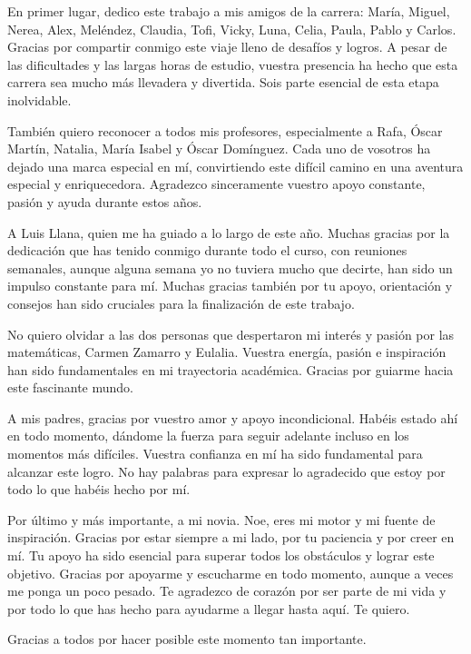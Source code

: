 \documentclass[11pt,a4paper]{book}
\begin{document}
En primer lugar, dedico este trabajo a mis amigos de la carrera: María, Miguel, Nerea, Alex, Meléndez, Claudia, Tofi, Vicky, Luna, Celia, Paula, Pablo y Carlos. Gracias por compartir conmigo este viaje lleno de desafíos y logros. A pesar de las dificultades y las largas horas de estudio, vuestra presencia ha hecho que esta carrera sea mucho más llevadera y divertida. Sois parte esencial de esta etapa inolvidable.

También quiero reconocer a todos mis profesores, especialmente a Rafa, Óscar Martín, Natalia, María Isabel y Óscar Domínguez. Cada uno de vosotros ha dejado una marca especial en mí, convirtiendo este difícil camino en una aventura especial y enriquecedora. Agradezco sinceramente vuestro apoyo constante, pasión y ayuda durante estos años.

A Luis Llana, quien me ha guiado a lo largo de este año. Muchas gracias por la dedicación que has tenido conmigo durante todo el curso, con reuniones semanales, aunque alguna semana yo no tuviera mucho que decirte, han sido un impulso constante para mí. Muchas gracias también por tu apoyo, orientación y consejos han sido cruciales para la finalización de este trabajo.

No quiero olvidar a las dos personas que despertaron mi interés y pasión por las matemáticas, Carmen Zamarro y Eulalia. Vuestra energía, pasión e inspiración han sido fundamentales en mi trayectoria académica. Gracias por guiarme hacia este fascinante mundo.
 

A mis padres, gracias por vuestro amor y apoyo incondicional. Habéis estado ahí en todo momento, dándome la fuerza para seguir adelante incluso en los momentos más difíciles. Vuestra confianza en mí ha sido fundamental para alcanzar este logro. No hay palabras para expresar lo agradecido que estoy por todo lo que habéis hecho por mí.

Por último y más importante, a mi novia. Noe, eres mi motor y mi fuente de inspiración. Gracias por estar siempre a mi lado, por tu paciencia y por creer en mí. Tu apoyo ha sido esencial para superar todos los obstáculos y lograr este objetivo. Gracias por apoyarme y escucharme en todo momento, aunque a veces me ponga un poco pesado. Te agradezco de corazón por ser parte de mi vida y por todo lo que has hecho para ayudarme a llegar hasta aquí. Te quiero.

Gracias a todos por hacer posible este momento tan importante.



 
\end{document}
